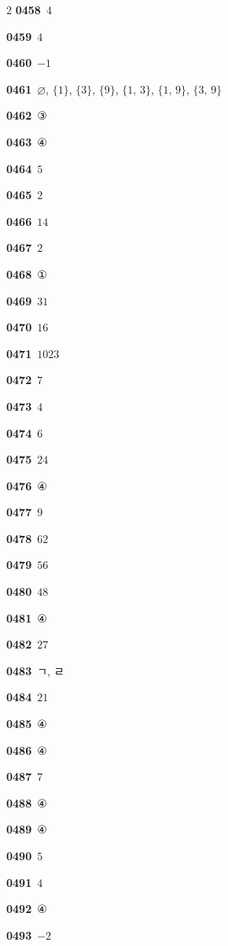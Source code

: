 \documentclass[10pt,a4paper]{article}
\begin{document}
\begin{multicols}{2}
\noindent\textbf{0458}\ $4$\par
\noindent\textbf{0459}\ $4$\par
\noindent\textbf{0460}\ $-1$\par
\noindent\textbf{0461}\ $\varnothing$, $\{1\}$, $\{3\}$, $\{9\}$, $\{1,\,3\}$, $\{1,\,9\}$, $\{3,\,9\}$\par
\noindent\textbf{0462}\ ③\par
\noindent\textbf{0463}\ ④\par
\noindent\textbf{0464}\ $5$\par
\noindent\textbf{0465}\ $2$\par
\noindent\textbf{0466}\ $14$\par
\noindent\textbf{0467}\ $2$\par
\noindent\textbf{0468}\ ①\par
\noindent\textbf{0469}\ $31$\par
\noindent\textbf{0470}\ $16$\par
\noindent\textbf{0471}\ $1023$\par
\noindent\textbf{0472}\ $7$\par
\noindent\textbf{0473}\ $4$\par
\noindent\textbf{0474}\ $6$\par
\noindent\textbf{0475}\ $24$\par
\noindent\textbf{0476}\ ④\par
\noindent\textbf{0477}\ $9$\par
\noindent\textbf{0478}\ $62$\par
\noindent\textbf{0479}\ $56$\par
\noindent\textbf{0480}\ $48$\par
\noindent\textbf{0481}\ ④\par
\noindent\textbf{0482}\ $27$\par
\noindent\textbf{0483}\ ㄱ, ㄹ\par
\noindent\textbf{0484}\ $21$\par
\noindent\textbf{0485}\ ④\par
\noindent\textbf{0486}\ ④\par
\noindent\textbf{0487}\ $7$\par
\noindent\textbf{0488}\ ④\par
\noindent\textbf{0489}\ ④\par
\noindent\textbf{0490}\ $5$\par
\noindent\textbf{0491}\ $4$\par
\noindent\textbf{0492}\ ④\par
\noindent\textbf{0493}\ $-2$\par

\end{multicols}
\end{document}
